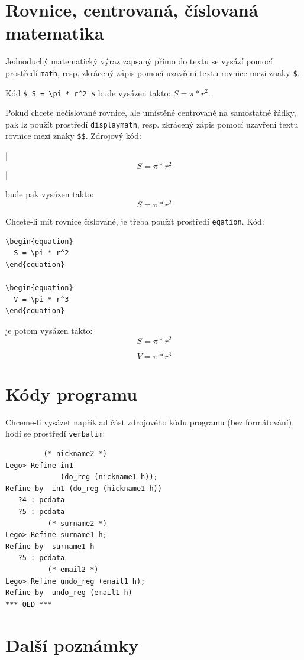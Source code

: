 \documentclass[11pt,twoside,a4paper]{book}
\begin{document}
\section{Rovnice, centrovaná, číslovaná matematika}
Jednoduchý matematický výraz zapsaný přímo do textu se vysází pomocí prostředí \verb|math|, resp. zkrácený
zápis pomocí uzavření textu rovnice mezi znaky \verb|$|.

Kód \verb|$ S = \pi * r^2 $| bude vysázen takto: $ S = \pi * r^2 $.

Pokud chcete nečíslované rovnice, ale umístěné centrovaně na samostatné řádky, pak lz  použít prostředí
\verb|displaymath|, resp. zkrácený zápis pomocí uzavření textu rovnice mezi znaky \verb|$$|. Zdrojový kód:
\begin{verb}
|$$ S = \pi * r^2 $$|
\end{verb}
bude pak vysázen takto:
$$ S = \pi * r^2 $$

Chcete-li mít rovnice číslované, je třeba použít prostředí \verb|eqation|. Kód:
\begin{verbatim}
\begin{equation}
  S = \pi * r^2
\end{equation}

\begin{equation}
  V = \pi * r^3
\end{equation}
\end{verbatim}
je potom vysázen takto:
\begin{equation}
  S = \pi * r^2
\end{equation}

\begin{equation}
  V = \pi * r^3
\end{equation}

\section{Kódy programu}
Chceme-li vysázet například část zdrojového kódu programu (bez formátování), hodí se prostředí \verb|verbatim|: 
\begin{verbatim}
         (* nickname2 *)
Lego> Refine in1
             (do_reg (nickname1 h));
Refine by  in1 (do_reg (nickname1 h))
   ?4 : pcdata
   ?5 : pcdata
          (* surname2 *)
Lego> Refine surname1 h;
Refine by  surname1 h
   ?5 : pcdata
          (* email2 *)
Lego> Refine undo_reg (email1 h);
Refine by  undo_reg (email1 h)
*** QED ***
\end{verbatim}

\section{Další poznámky}
\end{document}
